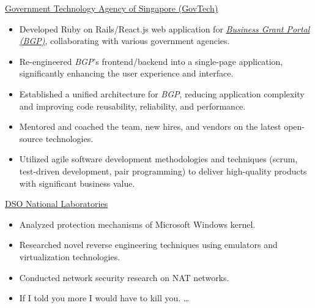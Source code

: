 \documentclass[]{cv} %
\begin{document}
\entry
{\href{https://www.tech.gov.sg/}{Government Technology Agency of Singapore (GovTech)}}
{
\begin{itemize}
\item Developed Ruby on Rails/React.js web application for \href{https://www.businessgrants.gov.sg/}{\emph{Business Grant Portal (BGP)}}, collaborating with various government agencies.
\item Re-engineered \emph{BGP}'s frontend/backend into a single-page application, significantly enhancing the user experience and interface.
\item Established a unified architecture for \emph{BGP}, reducing application complexity and improving code reusability, reliability, and performance.
\item Mentored and coached the team, new hires, and vendors on the latest open-source technologies.
\item Utilized agile software development methodologies and techniques (scrum, test-driven development, pair programming) to deliver high-quality products with significant business value.
\end{itemize}
}

\entry
{\href{https://www.dso.org.sg/}{DSO National Laboratories}}
{
\begin{itemize}
\item Analyzed protection mechanisms of Microsoft Windows kernel.
\item Researched novel reverse engineering techniques using emulators and virtualization technologies.
\item Conducted network security research on NAT networks.
\item If I told you more I would have to kill you. \dots
\end{itemize}
}


\end{document}
